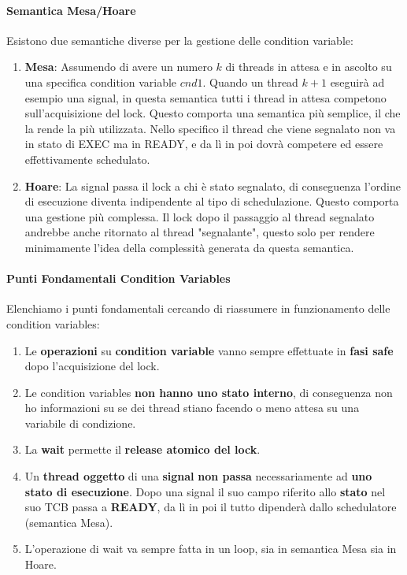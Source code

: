 \documentclass{article}
\begin{document}
\paragraph{Semantica Mesa/Hoare} Esistono due semantiche diverse per la gestione delle condition variable:

\begin{enumerate}
    \item \textbf{Mesa}: Assumendo di avere un numero $k$ di threads in attesa e in ascolto su una specifica condition variable $cnd1$. Quando un thread $k+1$
    eseguirà ad esempio una signal, in questa semantica tutti i thread in attesa competono sull'acquisizione del lock. Questo comporta una semantica più semplice, il che la rende la
    più utilizzata. Nello specifico il thread che viene segnalato non va in stato di EXEC ma in READY, e da lì in poi dovrà competere ed essere effettivamente schedulato.
    \item \textbf{Hoare}: La signal passa il lock a chi è stato segnalato, di conseguenza l'ordine di esecuzione diventa indipendente al tipo di schedulazione. Questo comporta una gestione più complessa.
    Il lock dopo il passaggio al thread segnalato andrebbe anche ritornato al thread "segnalante", questo solo per rendere minimamente l'idea della complessità generata da questa semantica.
\end{enumerate}

\newpage

\paragraph{Punti Fondamentali Condition Variables} Elenchiamo i punti fondamentali cercando di riassumere in funzionamento delle condition variables:

\begin{enumerate}
    \item Le \textbf{operazioni} su \textbf{condition variable} vanno sempre effettuate in \textbf{fasi safe} dopo l'acquisizione del lock.
    \item Le condition variables \textbf{non hanno uno stato interno}, di conseguenza non ho informazioni su se dei thread stiano facendo o meno attesa su una variabile di condizione.
    \item La \textbf{wait} permette il \textbf{release atomico del lock}.
    \item Un \textbf{thread oggetto} di una \textbf{signal} \textbf{non passa} necessariamente ad \textbf{uno stato di esecuzione}. Dopo una signal il suo campo riferito allo \textbf{stato} nel suo TCB passa a \textbf{READY}, da lì in poi il tutto dipenderà dallo schedulatore (semantica Mesa).
    \item L'operazione di wait va sempre fatta in un loop, sia in semantica Mesa sia in Hoare.
\end{enumerate}
\end{document}
